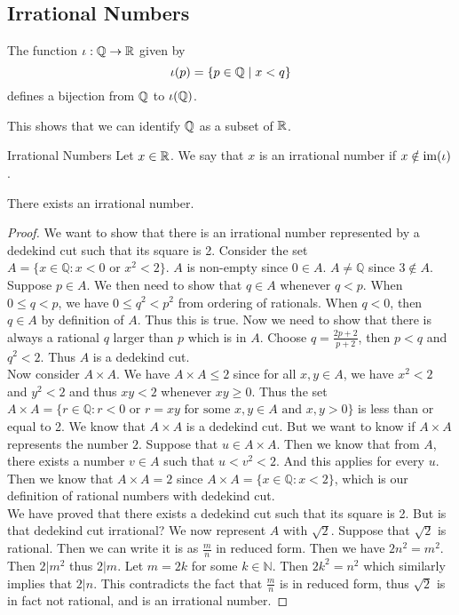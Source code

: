 \documentclass[a4paper]{article}
\begin{document}
\subsection{Irrational Numbers}
\begin{prp}{}{} The function $\iota:\mathbb{Q}\to\mathbb{R}$ given by $$\iota(p)=\{p\in\mathbb{Q}\;|\;x<q\}$$ defines a bijection from $\mathbb{Q}$ to $\iota(\mathbb{Q})$. 
\end{prp}

This shows that we can identify $\mathbb{Q}$ as a subset of $\mathbb{R}$. 

\begin{defn}{Irrational Numbers}{} Let $x\in\mathbb{R}$. We say that $x$ is an irrational number if $x\notin\operatorname{im}(\iota)$. 
\end{defn}

\begin{thm}{}{} There exists an irrational number. 
\begin{proof} We want to show that there is an irrational number represented by a dedekind cut such that its square is 2. Consider the set $A=\{x\in\mathbb{Q}:x<0\text{ or }x^2<2\}$. $A$ is non-empty since $0\in A$. $A\neq\mathbb{Q}$ since $3\notin A$. Suppose $p\in A$. We then need to show that $q\in A$ whenever $q<p$. When $0\leq q<p$, we have $0\leq q^2<p^2$ from ordering of rationals. When $q<0$, then $q\in A$ by definition of $A$. Thus this is true. Now we need to show that there is always a rational $q$ larger than $p$ which is in $A$. Choose $q=\frac{2p+2}{p+2}$, then $p<q$ and $q^2<2$. Thus $A$ is a dedekind cut. \\
Now consider $A\times A$. We have $A\times A\leq 2$ since for all $x,y\in A$, we have $x^2<2$ and $y^2<2$ and thus $xy<2$ whenever $xy\geq 0$. Thus the set $A\times A=\{r\in\mathbb{Q}:r<0\text{ or }r=xy\text{ for some }x,y\in A\text{ and }x,y>0\}$ is less than or equal to 2. We know that $A\times A$ is a dedekind cut. But we want to know if $A\times A$ represents the number $2$. Suppose that $u\in A\times A$. Then we know that from $A$, there exists a number $v\in A$ such that $u<v^2<2$. And this applies for every $u$. Then we know that $A\times A=2$ since $A\times A=\{x\in\mathbb{Q}:x<2\}$, which is our definition of rational numbers with dedekind cut. \\
We have proved that there exists a dedekind cut such that its square is 2. But is that dedekind cut irrational? We now represent $A$ with $\sqrt2$. Suppose that $\sqrt2$ is rational. Then we can write it is as $\frac{m}{n}$ in reduced form. Then we have $2n^2=m^2$. Then $2|m^2$ thus $2|m$. Let $m=2k$ for some $k\in\mathbb{N}$. Then $2k^2=n^2$ which similarly implies that $2|n$. This contradicts the fact that $\frac{m}{n}$ is in reduced form, thus $\sqrt{2}$ is in fact not rational, and is an irrational number. 
\end{proof}
\end{thm}
\end{document}
